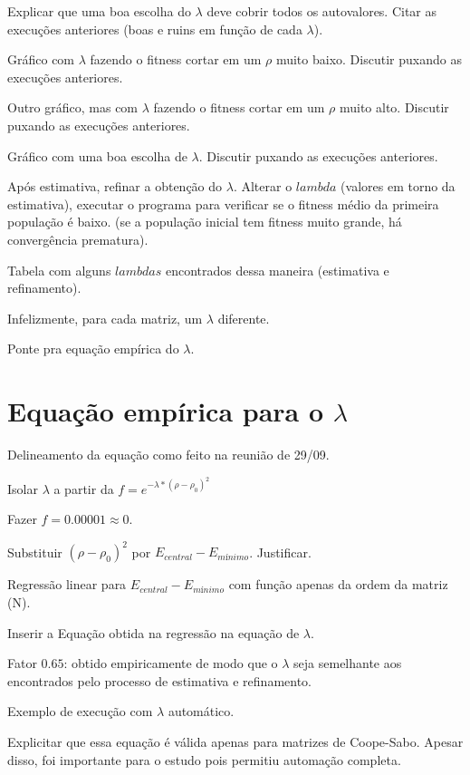 	Explicar que uma boa escolha do $\lambda$ deve cobrir todos os autovalores. Citar as execuções anteriores (boas e ruins em função de cada $\lambda$).
	
	Gráfico com $\lambda$ fazendo o fitness cortar em um $\rho$ muito baixo. Discutir puxando as execuções anteriores.
	
	Outro gráfico, mas com $\lambda$ fazendo o fitness cortar em um $\rho$ muito alto. Discutir puxando as execuções anteriores.
	
	Gráfico com uma boa escolha de $\lambda$. Discutir puxando as execuções anteriores.
	
	Após estimativa, refinar a obtenção do $\lambda$. Alterar o $lambda$ (valores em torno da estimativa), executar o programa para verificar se o fitness médio da primeira população é baixo. (se a população inicial tem fitness muito grande, há convergência prematura).
	
	Tabela com alguns $lambdas$ encontrados dessa maneira (estimativa e refinamento).
	
	Infelizmente, para cada matriz, um $\lambda$ diferente.
	
	Ponte pra equação empírica do $\lambda$.
	
	\section{Equação empírica para o $\lambda$}
	
	Delineamento da equação como feito na reunião de 29/09.
	
	Isolar $\lambda$ a partir da $f=e^{-\lambda*(\rho - \rho_0)^2}$
	
	Fazer $f = 0.00001 \approx 0$.
	
	Substituir $(\rho - \rho_0)^2$ por $E_{central} - E_{mínimo}$. Justificar.
	
	Regressão linear para $E_{central} - E_{mínimo}$ com função apenas da ordem da matriz (N).
	
	Inserir a Equação obtida na regressão na equação de $\lambda$.
	
	Fator $0.65$: obtido empiricamente de modo que o $\lambda$ seja semelhante aos encontrados pelo processo de estimativa e refinamento.
	
	Exemplo de execução com $\lambda$ automático.
	
	Explicitar que essa equação é válida apenas para matrizes de Coope-Sabo. Apesar disso, foi importante para o estudo pois permitiu automação completa.
		
